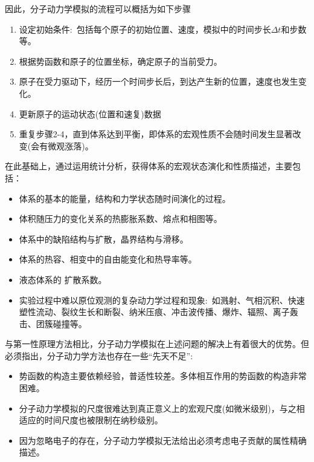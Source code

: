 因此，分子动力学模拟的流程可以概括为如下步骤
\begin{enumerate}
	\item 设定初始条件:~包括每个原子的初始位置、速度，模拟中的时间步长$\Delta t$和步数等。
	\item 根据势函数和原子的位置坐标，确定原子的当前受力。
	\item 原子在受力驱动下，经历一个时间步长后，到达产生新的位置，速度也发生变化。
	\item 更新原子的运动状态(位置和速复)数据
	\item 重复步骤\textrm{2-4}，直到体系达到平衡，即体系的宏观性质不会随时间发生显著改变(会有微观涨落)。
\end{enumerate}
在此基础上，通过运用统计分析，获得体系的宏观状态演化和性质描述，主要包括：
\begin{itemize}
	\item 体系的基本的能量，结构和力学状态随时间演化的过程。%
	\item 体积随压力的变化关系的热膨胀系数、熔点和相图等。
	\item 体系中的缺陷结构与扩散，晶界结构与滑移。
	\item 体系的热容、相变中的自由能变化和热导率等。
	\item 液态体系的%
		扩散系数。
	\item 实验过程中难以原位观测的复杂动力学过程和现象:~如溅射、气相沉积、快速塑性流动、裂纹生长和断裂、纳米压痕、冲击波传播、爆炸、辐照、离子轰击、团簇碰撞等。
\end{itemize}
与第一性原理方法相比，分子动力学模拟在上述问题的解决上有着很大的优势。但必须指出，分子动力学方法也存在一些``先天不足'':
\begin{itemize}
	\item 势函数的构造主要依赖经验，普适性较差。多体相互作用的势函数的构造非常困难。
	\item 分子动力学模拟的尺度很难达到真正意义上的宏观尺度(如微米级别)，与之相适应的时间尺度也被限制在纳秒级别。
	\item 因为忽略电子的存在，分子动力学模拟无法给出必须考虑电子贡献的属性精确描述。
\end{itemize}

